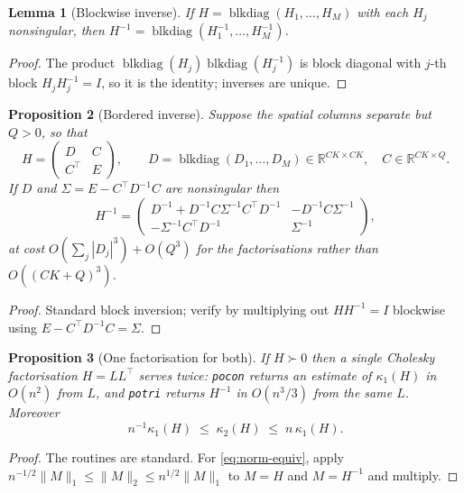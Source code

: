 \documentclass[11pt,a4paper]{article}
\theoremstyle{plain}
\newtheorem{proposition}{Proposition}
\newtheorem{lemma}[proposition]{Lemma}
\theoremstyle{definition}
\newcommand{\R}{\mathbb{R}}
\newcommand{\cond}{\kappa}
\newcommand{\blkdiag}{\operatorname{blkdiag}}
\begin{document}
\begin{lemma}[Blockwise inverse]\label{lem:blockwise}
If $H = \blkdiag(H_1,\dots,H_M)$ with each $H_j$ nonsingular, then
$H^{-1} = \blkdiag(H_1^{-1},\dots,H_M^{-1})$.
\end{lemma}
\begin{proof}
The product $\blkdiag(H_j)\blkdiag(H_j^{-1})$ is block diagonal with $j$-th block
$H_jH_j^{-1} = I$, so it is the identity; inverses are unique.
\end{proof}

\begin{proposition}[Bordered inverse]\label{prop:schur}
Suppose the spatial columns separate but $Q > 0$, so that
\[
  H = \begin{pmatrix} D & C\\ C^\top & E\end{pmatrix},
  \qquad D = \blkdiag(D_1,\dots,D_M)\in\R^{CK\times CK},\quad C\in\R^{CK\times Q}.
\]
If $D$ and $\Sigma = E - C^\top D^{-1}C$ are nonsingular then
\[
  H^{-1} = \begin{pmatrix}
    D^{-1} + D^{-1}C\Sigma^{-1}C^\top D^{-1} & -D^{-1}C\Sigma^{-1}\\
    -\Sigma^{-1}C^\top D^{-1} & \Sigma^{-1}\end{pmatrix},
\]
at cost $O(\sum_j |D_j|^3) + O(Q^3)$ for the factorisations rather than $O((CK+Q)^3)$.
\end{proposition}
\begin{proof}
Standard block inversion; verify by multiplying out $HH^{-1} = I$ blockwise using
$E - C^\top D^{-1}C = \Sigma$.
\end{proof}

\begin{proposition}[One factorisation for both]\label{prop:chol}
If $H \succ 0$ then a single Cholesky factorisation $H = LL^\top$ serves twice: \texttt{pocon}
returns an estimate of $\cond_1(H)$ in $O(n^2)$ from $L$, and \texttt{potri} returns $H^{-1}$ in
$O(n^3/3)$ from the same $L$. Moreover
\begin{equation}\label{eq:norm-equiv}
  n^{-1}\cond_1(H) \;\le\; \cond_2(H) \;\le\; n\,\cond_1(H).
\end{equation}
\end{proposition}
\begin{proof}
The routines are standard. For \eqref{eq:norm-equiv}, apply
$n^{-1/2}\|M\|_1 \le \|M\|_2 \le n^{1/2}\|M\|_1$ to $M = H$ and $M = H^{-1}$ and multiply.
\end{proof}
\end{document}

